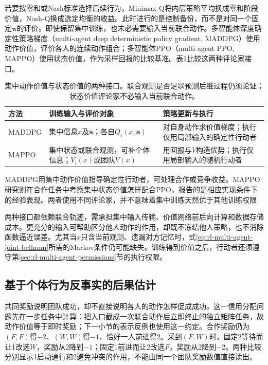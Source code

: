 若要按零和或Nash标准选择后续行为，Minimax-Q将内层策略平均换成零和阶段价值，Nash-Q换成选定均衡的收益。此时进行的是控制备份，而不是对同一个固定$\bm\pi$的评价。即使保留集中训练，也未必需要输入当前联合动作。多智能体深度确定性策略梯度（multi-agent deep deterministic policy gradient, MADDPG）使用动作价值，评价各人的连续动作组合；多智能体PPO（multi-agent PPO, MAPPO）使用状态价值，作为采样回报的比较基准。表\ref{tab:rl-multi-agent-critics}比较这两种评论家接口。

\begin{table}[htbp]
 \centering
 \begin{tabularx}{\linewidth}{@{}l >{\raggedright\arraybackslash}X >{\raggedright\arraybackslash}X@{}}
 \toprule
 方法 & 训练输入与评价对象 & 策略更新与执行\\
 \midrule
 MADDPG & 集中信息$x$及$\bm a$；各自$Q_i(x,\bm a)$ & 对自身动作求价值梯度；执行仅用局部输入的确定性行动者\\
 MAPPO & 集中状态或联合观测，可补个体信息；$V_i(x)$或团队$V(x)$ & 用回报与$V$构造优势；执行仅用局部输入的随机行动者\\
 \bottomrule
 \end{tabularx}
 \caption{集中动作价值与状态价值的两种接口。联合观测是否足以预测后继过程仍须论证；状态价值评论家不必输入当前联合动作。}
 \label{tab:rl-multi-agent-critics}
\end{table}

MADDPG用集中动作价值指导确定性行动者，可处理合作或竞争收益。MAPPO研究则在合作任务中考察集中状态价值怎样配合PPO，报告的是相应实现条件下的经验表现。两者使用不同评论家，并不意味着集中训练天然优于其他训练权限

两种接口都依赖联合轨迹，需承担集中输入传输、价值网络前后向计算和数据存储成本。更充分的输入可帮助区分他人动作的作用，却既不冻结他人策略，也不消除函数逼近误差。尤其当$x$只含当前观测、遗漏对方记忆时，式\eqref{eq:rl-multi-agent-joint-bellman}所需的Markov条件仍可能缺失。训练得到价值之后，行动者还须遵守第\ref{sec:rl-multi-agent-permissions}节的执行权限。

\subsection{基于个体行为反事实的后果估计}
\label{sec:rl-multi-agent-counterfactual}

共同奖励说明团队成功，却不直接说明各人的动作怎样促成成功。这一信用分配问题先在一步任务中计算：把入口截成一次联合动作后立即终止的独立矩阵任务，故动作价值等于即时奖励；下一小节的表示反例也使用这一约定。合作奖励仍为$(F,F)$得$-2$、$(W,W)$得$-1$、恰好一人前进得2。采到$(F,W)$时，固定2等待而让1改选$W$，奖励从2降到$-1$；固定1前进而让2改选$F$，奖励从2降到$-2$。两种比较分别显示1启动通行和2避免冲突的作用，不能由同一个团队奖励数值直接读出。

